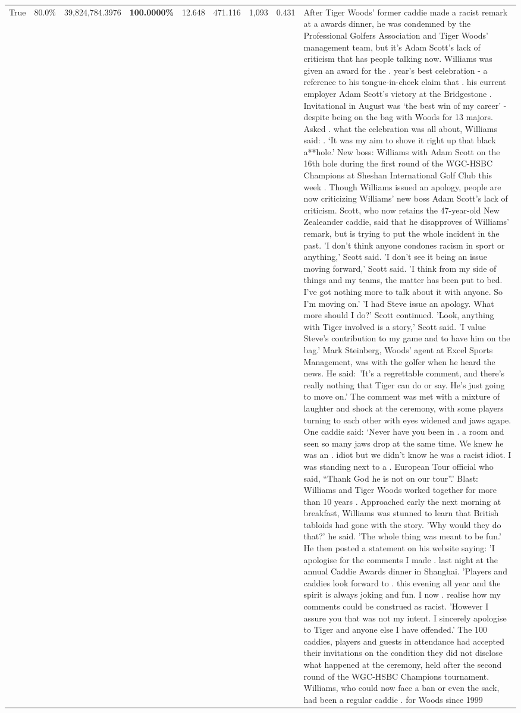 \begin{table}[H]
\begin{tabular}{lllrlllll}
True & 80.0\% & 39,824,784.3976 & \bfseries \color{red} 100.0000\% & 12.648 & 471.116 & 1,093 & 0.431 & After Tiger Woods' former caddie made a racist remark at a awards dinner, he was condemned by the Professional Golfers Association and Tiger Woods' management team, but it's Adam Scott's lack of criticism that has people talking now. Williams was given an award for the . year’s best celebration - a reference to his tongue-in-cheek claim that . his current employer Adam Scott’s victory at the Bridgestone . Invitational in August was ‘the best win of my career’ - despite being on the bag with Woods for 13 majors. Asked . what the celebration was all about, Williams said: . ‘It was my aim to shove it right up that black a**hole.’ New boss: Williams with Adam Scott  on the 16th hole during the first round of the WGC-HSBC Champions at Sheshan International Golf Club this week . Though Williams issued an apology, people are now criticizing Williams' new boss Adam Scott's lack of criticism. Scott, who now retains the 47-year-old New Zealeander caddie, said that he disapproves of Williams' remark, but is trying to put the whole incident in the past. 'I don't think anyone condones racism in sport or anything,' Scott said. 'I don't see it being an issue moving forward,' Scott said. 'I think from my side of things and my teams, the matter has been put to bed. I've got nothing more to talk about it with anyone. So I'm moving on.' 'I had Steve issue an apology. What more should I do?' Scott continued. 'Look, anything with Tiger involved is a story,' Scott said. 'I value Steve's contribution to my game and to have him on the bag.' Mark Steinberg, Woods' agent at Excel Sports Management, was with the golfer when he heard the news. He said: 'It's a regrettable comment, and there's really nothing that Tiger can do or say. He's just going to move on.' The comment was met with a mixture of laughter and shock at the ceremony, with some players turning to each other with eyes widened and jaws agape. One caddie said: ‘Never have you been in . a room and seen so many jaws drop at the same time. We knew he was an . idiot but we didn’t know he was a racist idiot. I was standing next to a . European Tour official who said, “Thank God he is not on our tour”.’ Blast: Williams and Tiger Woods worked together for more than 10 years . Approached early the next morning at breakfast, Williams was stunned to learn that British tabloids had gone with the story. 'Why would they do that?' he said. 'The whole thing was meant to be fun.' He then posted a statement on his website saying: 'I apologise for the comments I made . last night at the annual Caddie Awards dinner in Shanghai. 'Players and caddies look forward to . this evening all year and the spirit is always joking and fun. I now . realise how my comments could be construed as racist. 'However I assure you that was not my intent. I sincerely apologise to Tiger and anyone else I have offended.' The 100 caddies, players and guests in attendance had accepted their invitations on the condition they did not disclose what happened at the ceremony, held after the second round of the WGC-HSBC Champions tournament. Williams, who could now face a ban or even the sack, had been a regular caddie . for Woods since 1999 
\end{tabular}
\end{table}
